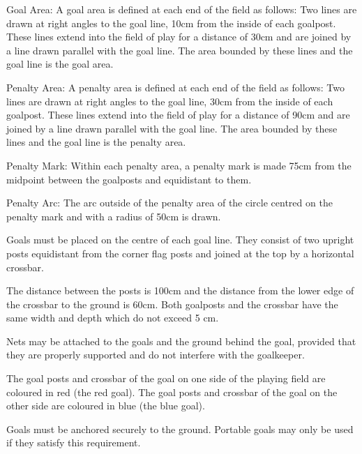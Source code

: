 \documentclass[12pt]{hurocup}
\begin{document}
\begin{lawlist}[US]
\item Goal Area: A goal area is defined at each end of the field as
  follows: Two lines are drawn at right angles to the goal line, 10cm
  from the inside of each goalpost. These lines extend into the field
  of play for a distance of 30cm and are joined by a line drawn
  parallel with the goal line. The area bounded by these lines and the
  goal line is the goal area.
  
\item Penalty Area: A penalty area is defined at each end of the field
  as follows: Two lines are drawn at right angles to the goal line,
  30cm from the inside of each goalpost. These lines extend into the
  field of play for a distance of 90cm and are joined by a line drawn
  parallel with the goal line. The area bounded by these lines and the
  goal line is the penalty area.
  
\item \label{penalty-mark} Penalty Mark: Within each penalty area, a
  penalty mark is made 75cm from the midpoint between the goalposts
  and equidistant to them.
  
\item \label{penalty-arc} Penalty Arc: The arc outside of the penalty
  area of the circle centred on the penalty mark and with a radius of
  50cm is drawn.

\item Goals must be placed on the centre of each goal line. They
  consist of two upright posts equidistant from the corner flag posts
  and joined at the top by a horizontal crossbar.
  
\item The distance between the posts is 100cm and the distance from
  the lower edge of the crossbar to the ground is 60cm. Both goalposts
  and the crossbar have the same width and depth which do not exceed 5
  cm.
  
\item Nets may be attached to the goals and the ground behind the
  goal, provided that they are properly supported and do not interfere
  with the goalkeeper.
  
\item The goal posts and crossbar of the goal on one side of the
  playing field are coloured in red (the red goal).
  The goal posts and crossbar of the goal on the other side are
  coloured in blue (the blue goal).
  
\item Goals must be anchored securely to the ground. Portable goals
  may only be used if they satisfy this requirement.

\end{lawlist}
\end{document}

